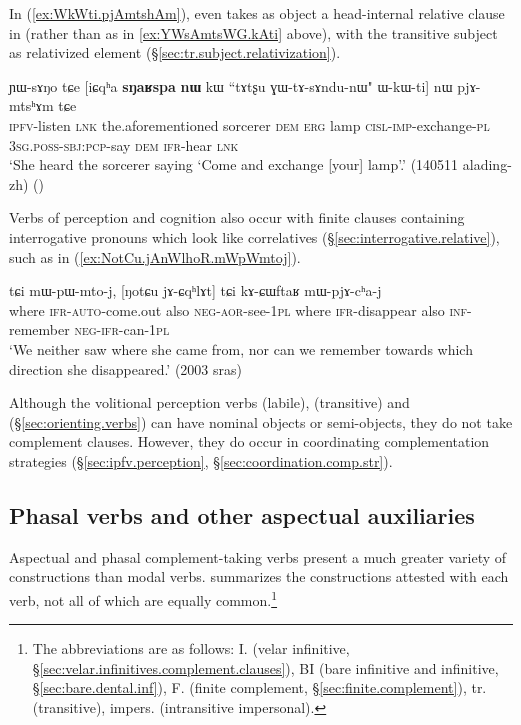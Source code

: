  In   (\ref{ex:WkWti.pjAmtshAm}),  even takes as object a head-internal relative clause in  (rather than  as in \ref{ex:YWsAmtsWG.kAti} above), with the transitive subject as relativized element (§\ref{sec:tr.subject.relativization}).
 
\begin{exe}
\ex \label{ex:WkWti.pjAmtshAm}
 \gll  ɲɯ-sɤŋo tɕe [iɕqʰa \textbf{sŋaʁspa} \textbf{nɯ} kɯ ``tɤtʂu ɣɯ-tɤ-sɤndu-nɯ" ɯ-kɯ-ti] nɯ pjɤ-mtsʰɤm tɕe \\
 \textsc{ipfv}-listen \textsc{lnk} the.aforementioned sorcerer \textsc{dem} \textsc{erg} lamp \textsc{cisl}-\textsc{imp}-exchange-\textsc{pl} \textsc{3sg}.\textsc{poss}-\textsc{sbj}:\textsc{pcp}-say \textsc{dem} \textsc{ifr}-hear \textsc{lnk} \\
 \glt `She heard the sorcerer saying `Come and exchange [your] lamp'.' (140511 alading-zh)
 ()
 \end{exe}

Verbs of perception and cognition also occur with finite clauses containing interrogative pronouns which look like correlatives (§\ref{sec:interrogative.relative}), such as  in (\ref{ex:NotCu.jAnWlhoR.mWpWmtoj}).

\begin{exe}
\ex \label{ex:NotCu.jAnWlhoR.mWpWmtoj}
  tɕi mɯ-pɯ-mto-j, [ŋotɕu jɤ-ɕqʰlɤt] tɕi kɤ-ɕɯftaʁ mɯ-pjɤ-cʰa-j \\
where \textsc{ifr}-\textsc{auto}-come.out also \textsc{neg}-\textsc{aor}-see-\textsc{1pl} where \textsc{ifr}-disappear also \textsc{inf}-remember \textsc{neg}-\textsc{ifr}-can-\textsc{1pl} \\
\glt `We neither saw where she came from, nor can we remember towards which direction she disappeared.' (2003 sras)
 \end{exe}
 
Although the volitional perception verbs   (labile),  (transitive) and  (§\ref{sec:orienting.verbs}) can have nominal objects or semi-objects, they do not take complement clauses. However, they do occur in coordinating complementation strategies (§\ref{sec:ipfv.perception}, §\ref{sec:coordination.comp.str}).
 

  \subsection{Phasal verbs and other aspectual auxiliaries} \label{sec:aspectual.complement}
Aspectual and phasal complement-taking verbs present a  much greater variety of constructions than modal verbs.  summarizes the constructions attested with each verb, not all of which are equally common.\footnote{The abbreviations are as follows: 	I. (velar infinitive, §\ref{sec:velar.infinitives.complement.clauses}), BI (bare infinitive and  infinitive, §\ref{sec:bare.dental.inf}), 	F. (finite complement, §\ref{sec:finite.complement}), tr. (transitive), impers. (intransitive impersonal). }  
  

